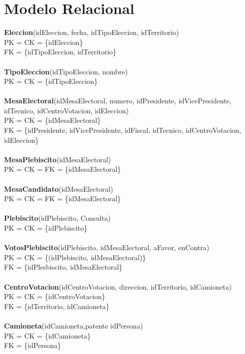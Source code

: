 \section{Modelo Relacional}

\textbf{Eleccion}(idEleccion, fecha, idTipoEleccion, idTerritorio)\\
  PK = CK = \{idEleccion\}\\
  FK = \{idTipoEleccion, idTerritorio\}\\
\\
\textbf{TipoEleccion}(idTipoEleccion, nombre)\\
  PK = CK = \{idTipoEleccion\}\\
\\
\textbf{MesaElectoral}(idMesaElectoral, numero, idPresidente, idVicePresidente, idTecnico, idCentroVotacion, idEleccion)\\
  PK = CK = \{idMesaElectoral\}\\
  FK = \{idPresidente, idVicePresidente, idFiscal, idTecnico, idCentroVotacion, idEleccion\}\\
\\
\textbf{MesaPlebiscito}(idMesaElectoral)\\
  PK = CK = FK = \{idMesaElectoral\}\\
\\
\textbf{MesaCandidato}(idMesaElectoral)\\
  PK = CK = FK = \{idMesaElectoral\}\\
\\
\textbf{Plebiscito}(idPlebiscito, Consulta)\\
  PK = CK = \{idPlebiscito\}\\
\\
\textbf{VotosPlebiscito}(idPlebiscito, idMesaElectoral, aFavor, enContra)\\
  PK = CK = \{(idPlebiscito, idMesaElectoral)\}\\
  FK = \{idPlesbiscito, idMesaElectoral\}\\
\\
\textbf{CentroVotacion}(idCentroVotacion, direccion, idTerritorio, idCamioneta)\\
  PK = CK = \{idCentroVotacion\}\\
  FK = \{idTerritorio, idCamioneta\}\\
\\
\textbf{Camioneta}(idCamioneta,patente idPersona)\\
  PK = CK = \{idCamioneta\}\\
  FK = \{idPersona\}\\
